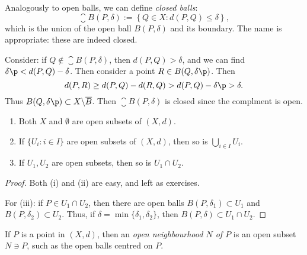 \begin{example}
	Analogously to open balls, we can define \emph{closed balls}:
	\begin{equation*}
		\closure{B}(P,\delta) := \left\{Q\in X: d(P,Q) \leq \delta\right\},
	\end{equation*}
	which is the union of the open ball $B(P,\delta)$ and its boundary. The name is appropriate: these are indeed closed.

	Consider: if $Q\not\in\closure{B}(P,\delta)$, then $d(P,Q)>\delta$, and we can find $\delta\p<d(P,Q) - \delta$. Then consider a point $R \in B(Q,\delta\p)$. Then
	\begin{equation*}
		d(P,R)
		\geq d(P,Q) - d(R,Q)
		> d(P,Q) - \delta\p
		> \delta.
	\end{equation*}
	Thus $B(Q,\delta\p) \subset X\backslash\closure{B}$. Then $\closure{B}(P,\delta)$ is closed since the complment is open.
\end{example}

\begin{lemma}
\mbox{}
\begin{enumerate}
	\shortskip
	\item Both $X$ and $\emptyset$ are open subsets of $(X,d)$.
	\item If $\{U_i:i\in I\}$ are open subsets of $(X,d)$, then so is $\bigcup_{i\in I} U_i$.
	\item If $U_1,U_2$ are open subsets, then so is $U_1 \cap U_2$.
\end{enumerate}
\end{lemma}

\begin{proof}
	Both (i) and (ii) are easy, and left as exercises.
	
	For (iii): if $P \in U_1 \cap U_2$, then there are open balls $B(P,\delta_1)\subset U_1$ and $B(P,\delta_2) \subset U_2$. Thus, if $\delta=\min\{\delta_1,\delta_2\}$, then $B(P,\delta) \subset U_1 \cap U_2$. %
\end{proof}

\begin{definition}
	If $P$ is a point in $(X,d)$, then an \emph{open neighbourhood $N$ of $P$} is an open subset $N\ni P$, such as the open balls centred on $P$.
\end{definition}

